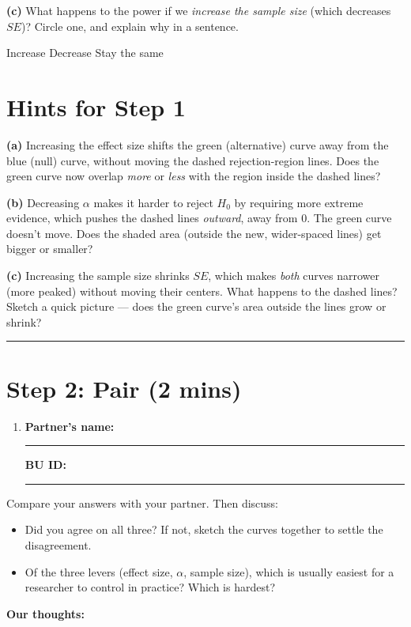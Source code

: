 \documentclass{article}
\newcommand{\nameblank}{\rule{1.75in}{0.4pt}}
\newcommand{\idblank}{\rule{1.55in}{0.4pt}}
\begin{document}
\textbf{(c)} What happens to the power if we \emph{increase the sample size} (which decreases $SE$)? Circle one, and explain why in a sentence.
\begin{center}
Increase \hspace{0.5in} Decrease \hspace{0.5in} Stay the same
\end{center}
\vspace{0.5in}

\newpage
\section*{Hints for Step 1}

\textbf{(a)} Increasing the effect size shifts the green (alternative) curve away from the blue (null) curve, without moving the dashed rejection-region lines. Does the green curve now overlap \emph{more} or \emph{less} with the region inside the dashed lines?

\vspace{0.2in}

\textbf{(b)} Decreasing $\alpha$ makes it harder to reject $H_0$ by requiring more extreme evidence, which pushes the dashed lines \emph{outward}, away from 0. The green curve doesn't move. Does the shaded area (outside the new, wider-spaced lines) get bigger or smaller?

\vspace{0.2in}

\textbf{(c)} Increasing the sample size shrinks $SE$, which makes \emph{both} curves narrower (more peaked) without moving their centers. What happens to the dashed lines? Sketch a quick picture --- does the green curve's area outside the lines grow or shrink?

\vspace{0.2in}
\noindent\rule{\linewidth}{0.4pt}
\vspace{0.2in}

\section*{Step 2: Pair (2 mins)}

\begin{enumerate}[label=\arabic*.,leftmargin=*,itemsep=.7em, start=2]
  \item \textbf{Partner's name:} \nameblank \hfill \textbf{BU ID:} \idblank
\end{enumerate}

Compare your answers with your partner. Then discuss:

\begin{itemize}
  \item Did you agree on all three? If not, sketch the curves together to settle the disagreement.
  \item Of the three levers (effect size, $\alpha$, sample size), which is usually easiest for a researcher to control in practice? Which is hardest?
\end{itemize}

\textbf{Our thoughts:}
\vfill
\end{document}
